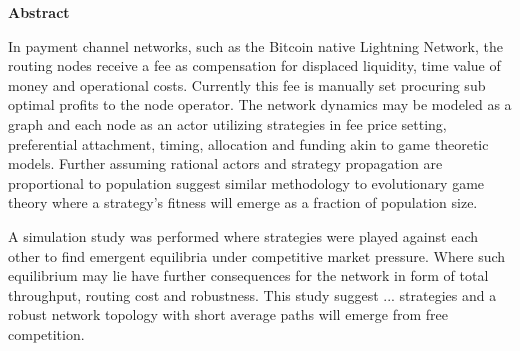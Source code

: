 \begin{center}
	\textbf{Abstract}
\end{center} 

In payment channel networks, such as the Bitcoin native Lightning Network, the routing nodes receive a fee as compensation for displaced liquidity, time value of money and operational costs. Currently this fee is manually set procuring sub optimal profits to the node operator. The network dynamics may be modeled as a graph and each node as an actor utilizing strategies in fee price setting, preferential attachment, timing, allocation and funding akin to game theoretic models. Further assuming rational actors and strategy propagation are proportional to population suggest similar methodology to evolutionary game theory where a strategy's fitness will emerge as a fraction of population size. 

A simulation study was performed where strategies were played against each other to find emergent equilibria under competitive market pressure. Where such equilibrium may lie have further consequences for the network in form of total throughput, routing cost and robustness. This study suggest ... strategies and a robust network topology with short average paths will emerge from free competition.

